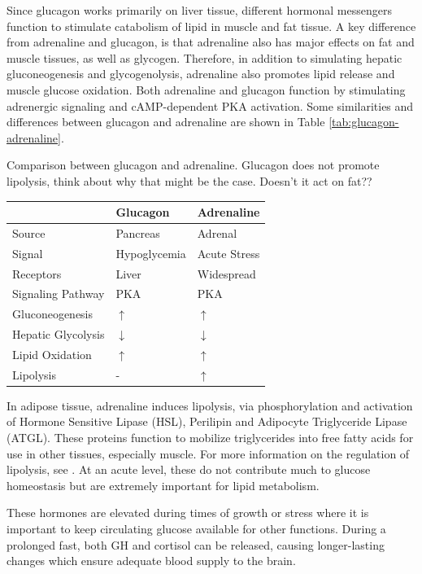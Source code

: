 \documentclass{tufte-handout}
\begin{document}
Since glucagon works primarily on liver tissue, different hormonal messengers function to stimulate catabolism of lipid in muscle and fat tissue.  A key difference from adrenaline and glucagon, is that adrenaline also has major effects on fat and muscle tissues, as well as glycogen.  Therefore, in addition to simulating hepatic gluconeogenesis and glycogenolysis, adrenaline also promotes lipid release and muscle glucose oxidation.  Both adrenaline and glucagon function by stimulating adrenergic signaling and cAMP-dependent PKA activation.  Some similarities and differences between glucagon and adrenaline are shown in Table \ref{tab:glucagon-adrenaline}.

\begin{margintable}
\caption{Comparison between glucagon and adrenaline.  Glucagon does not promote lipolysis, think about why that might be the case. Doesn't it act on fat??}
\label{tab:glucagon-adrenaline}
\begin{tabular}{@{}lll@{}}
 & \textbf{Glucagon}  & \textbf{Adrenaline}           \\ \midrule
Source & Pancreas & Adrenal \\ 
Signal & Hypoglycemia & Acute Stress \\ 
Receptors & Liver & Widespread \\ 
Signaling Pathway & PKA & PKA \\  
Gluconeogenesis & $\uparrow$ & $\uparrow$ \\  
Hepatic Glycolysis & $\downarrow$ & $\downarrow$ \\ 
Lipid Oxidation & $\uparrow$ & $\uparrow$ \\ 
Lipolysis & - & $\uparrow$\\ \bottomrule
\end{tabular}
\end{margintable}

In adipose tissue, adrenaline induces lipolysis, via phosphorylation and activation of Hormone Sensitive Lipase (HSL), Perilipin and Adipocyte Triglyceride Lipase (ATGL).  These proteins function to mobilize triglycerides into free fatty acids for use in other tissues, especially muscle.  For more information on the regulation of lipolysis, see \citep{Young2013}.  At an acute level, these do not contribute much to glucose homeostasis but are extremely important for lipid metabolism.

  These hormones are elevated during times of growth or stress where it is important to keep circulating glucose available for other functions.  During a prolonged fast, both GH and cortisol can be released, causing longer-lasting changes which ensure adequate blood supply to the brain.
\end{document}
